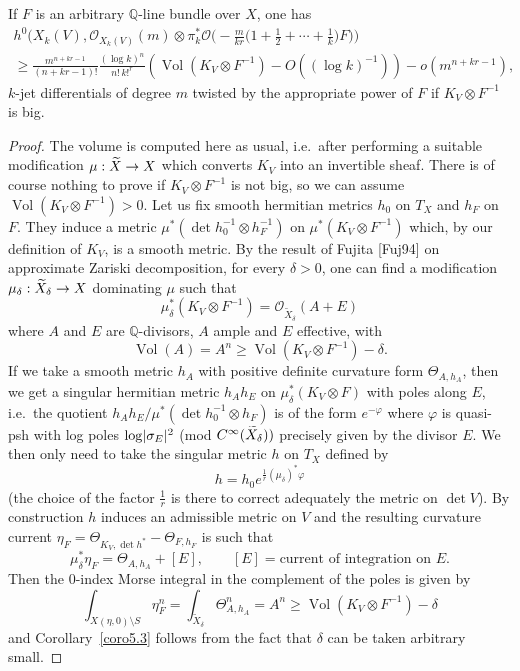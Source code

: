 \documentclass[AHL,Unicode,longabstracts,published]{cedram}
\DeclareMathOperator{\Vol}{Vol}
\DeclarePairedDelimiter{\abs}{\lvert}{\rvert}
\newcommand*\cO{\mathcal{O}}
\newcommand*\bQ{\mathbb{Q}}
\let\geq\geqslant
\begin{document}
\begin{coro}\label{coro5.3}
If $F$ is an arbitrary $\bQ$-line bundle over $X$, one has
\begin{multline*}
h^0\bigg(X_k(V),\cO_{X_k(V)}(m)\otimes\pi_k^*\cO
\Big(-\tfrac{m}{ kr}\Big(1+\tfrac{1}{ 2}+\cdots+\tfrac{1}{ k}\Big)F\Big)\bigg)
\\
\geq \tfrac{m^{n+kr-1}}{(n+kr-1)!}
\tfrac{(\log k)^n}{ n!\,k!^r}\left(
\Vol(K_V\otimes F^{-1})-O\left((\log k)^{-1}\right)\right)-o\left(m^{n+kr-1}\right),
\end{multline*}
$k$-jet differentials of degree $m$ twisted by the appropriate power of $F$ if $K_V\otimes F^{-1}$ is big.
\end{coro}
\begin{proof}
The volume is computed here as usual, i.e.\ after performing a suitable modifi\-cation $\mu:\smash{\widetilde X}\to X$ which converts $K_V$ into an invertible sheaf. There is of course nothing to prove if
$K_V\otimes F^{-1}$ is not big, so we can assume $\Vol(K_V\otimes F^{-1})>0$. Let us fix smooth hermitian metrics $h_0$ on $T_X$ and
$h_F$ on $F$. They induce a metric $\mu^*(\det h_0^{-1}\otimes h_F^{-1})$ on $\mu^*(K_V\otimes F^{-1})$ which, by our definition of $K_V$, is a smooth metric. By the result of Fujita [Fuj94] on approximate Zariski decomposition, for every $\delta>0$, one can find a modification $\mu_\delta:\smash{\widetilde X_\delta}\to X$ dominating
$\mu$ such that
\[
\mu_\delta^*\left(K_V\otimes F^{-1}\right) =\cO_{\widetilde X_\delta}(A+E)
\]
where $A$ and $E$ are $\bQ$-divisors, $A$ ample and $E$ effective, with
\[
\Vol(A)=A^n\geq \Vol\left(K_V\otimes F^{-1}\right)-\delta.
\]
If we take a smooth metric $h_A$ with positive definite curvature form
$\Theta_{A,h_A}$, then we get a singular hermitian metric $h_Ah_E$ on
$\mu_\delta^*(K_V\otimes F)$ with poles along $E$, i.e.\ the quotient
$h_Ah_E/\mu^*(\det h_0^{-1}\otimes h_F)$ is of the form $e^{-\varphi}$ where
$\varphi$ is quasi-psh with log poles $\log\abs{\sigma_E}^2$ (mod $C^\infty(\smash{\widetilde X_\delta}))$ precisely given by the divisor $E$. We then only need to take the singular metric $h$ on $T_X$ defined by
\[
h=h_0e^{\tfrac{1}{ r}(\mu_\delta)^*\varphi}
\]
(the choice of the factor $\tfrac{1}{ r}$ is there to correct adequately the metric on $\det V$). By construction $h$ induces an admissible metric on $V$ and the resulting curvature current $\eta_F=\Theta_{K_V,\det h^*}-\Theta_{F,h_F}$ is such that
\[
\mu_\delta^*\eta_F = \Theta_{A,h_A} +[E],\qquad
\text{$[E]={}$current of integration on $E$.}
\]
Then the $0$-index Morse integral in the complement of the poles is given by
\[
\int_{X(\eta,0)\setminus S}\eta_F^n=\int_{\widetilde X_\delta}\Theta_{A,h_A}^n=A^n\ge
\Vol\left(K_V\otimes F^{-1}\right)-\delta
\]
and Corollary~\ref{coro5.3} follows from the fact that $\delta$ can be taken arbitrary small.
\end{proof}
\end{document}
